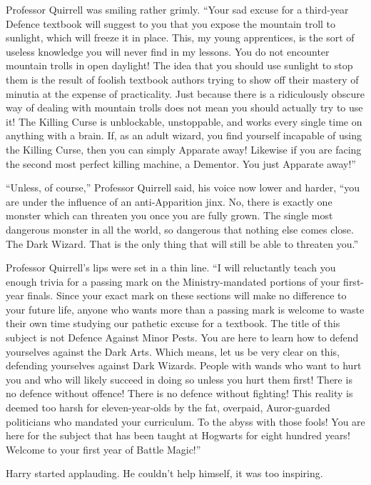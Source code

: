 Professor Quirrell was smiling rather grimly. ``Your sad excuse for a third-year Defence textbook will suggest to you that you expose the mountain troll to sunlight, which will freeze it in place. This, my young apprentices, is the sort of useless knowledge you will never find in my lessons. You do not encounter mountain trolls in open daylight! The idea that you should use sunlight to stop them is the result of foolish textbook authors trying to show off their mastery of minutia at the expense of practicality. Just because there is a ridiculously obscure way of dealing with mountain trolls does not mean you should actually try to use it! The Killing Curse is unblockable, unstoppable, and works every single time on anything with a brain. If, as an adult wizard, you find yourself incapable of using the Killing Curse, then you can simply Apparate away! Likewise if you are facing the second most perfect killing machine, a Dementor. You just Apparate away!''

``Unless, of course,'' Professor Quirrell said, his voice now lower and harder, ``you are under the influence of an anti-Apparition jinx. No, there is exactly one monster which can threaten you once you are fully grown. The single most dangerous monster in all the world, so dangerous that nothing else comes close. The Dark Wizard. That is the only thing that will still be able to threaten you.''

Professor Quirrell's lips were set in a thin line. ``I will reluctantly teach you enough trivia for a passing mark on the Ministry-mandated portions of your first-year finals. Since your exact mark on these sections will make no difference to your future life, anyone who wants more than a passing mark is welcome to waste their own time studying our pathetic excuse for a textbook. The title of this subject is not Defence Against Minor Pests. You are here to learn how to defend yourselves against the Dark Arts. Which means, let us be very clear on this, defending yourselves against Dark Wizards. People with wands who want to hurt you and who will likely succeed in doing so unless you hurt them first! There is no defence without offence! There is no defence without fighting! This reality is deemed too harsh for eleven-year-olds by the fat, overpaid, Auror-guarded politicians who mandated your curriculum. To the abyss with those fools! You are here for the subject that has been taught at Hogwarts for eight hundred years! Welcome to your first year of Battle Magic!''

Harry started applauding. He couldn't help himself, it was too inspiring.

